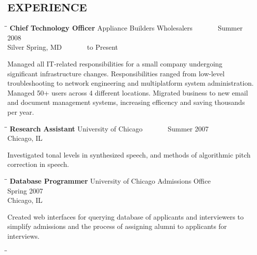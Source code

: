 \documentclass{res}
\begin{document}
\begin{resume}
\section{EXPERIENCE}
   \vspace{-0.1in}	
   \begin{tabbing}
   \hspace{2.3in}\= \hspace{2.6in}\= \kill %
    {\bf Chief Technology Officer} \>Appliance Builders Wholesalers \> ~~~~~~ Summer 2008 \\
                             \>Silver Spring, MD                    \> ~~~~~~ to Present
   \end{tabbing}\vspace{-20pt}      %
    Managed all IT-related responsibilities for a small company undergoing significant infrastructure changes. Responsibilities ranged from low-level troubleshooting to network engineering and multiplatform system administration. Managed 50+ users across 4 different locations. Migrated business to new email and document management systems, increasing efficency and saving thousands per year.
   \begin{tabbing}
   \hspace{2.3in}\= \hspace{2.6in}\= \kill %
    {\bf Research Assistant} \>University of Chicago \> ~~~~~~ Summer 2007\\
                          \>Chicago, IL
   \end{tabbing}\vspace{-20pt}
   Investigated tonal levels in synthesized speech, and methods of algorithmic pitch correction
   in speech.
   \begin{tabbing}
   \hspace{2.3in}\= \hspace{2.6in}\= \kill %
    {\bf Database Programmer } \>University of Chicago Admissions Office \> ~~~~~~ Spring 2007\\
                             \>Chicago, IL
   \end{tabbing}\vspace{-20pt}      %
   Created web interfaces for querying database of applicants and interviewers to simplify admissions and the process of assigning alumni to applicants for interviews.
   \begin{tabbing}%
   \hspace{2.3in}\= \hspace{2.6in}\= \kill %

\end{tabbing}
\end{resume}
\end{document}
